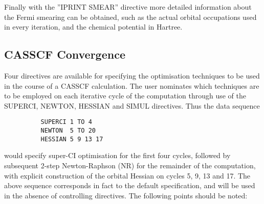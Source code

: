 \documentclass[11pt,fleqn]{article}
\begin{document}
Finally with the ''IPRINT SMEAR'' directive more detailed information about
the Fermi smearing can be obtained, such as the actual orbital occupations
used in every iteration, and the chemical potential in Hartree.

\subsection[CASSCF Convergence]{CASSCF Convergence}

Four directives are available for specifying the optimisation
techniques to be used in the course of a CASSCF calculation. The
user nominates which techniques are to be employed on
each iterative cycle of the computation through use of
the SUPERCI, NEWTON, HESSIAN and SIMUL directives.
Thus the data sequence

{
\footnotesize
\begin{verbatim}
          SUPERCI 1 TO 4
          NEWTON  5 TO 20
          HESSIAN 5 9 13 17
\end{verbatim}
}
would specify super-CI optimisation for the first four
cycles, followed by subsequent 2-step Newton-Raphson (NR)
for the remainder of the computation, with explicit
construction of the orbital Hessian on cycles 5, 9, 13 and 17. The
above sequence corresponds in fact to the default
specification, and will be used in the absence of controlling
directives.
The following points should be noted:
\end{document}
